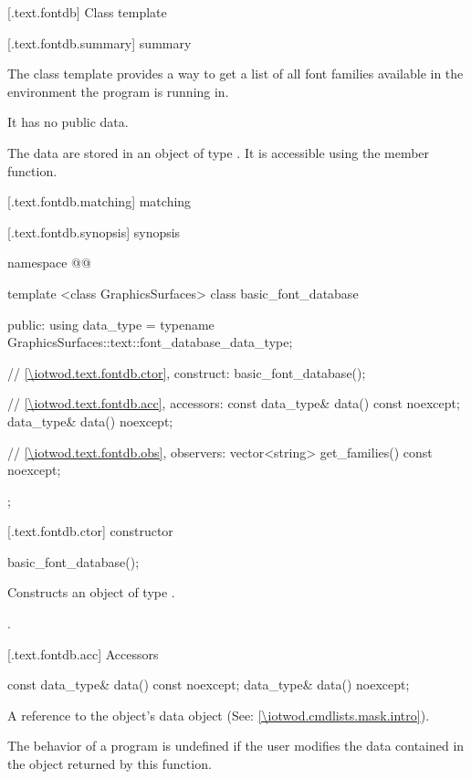 
 [\iotwod.text.fontdb] {Class template }

 [\iotwod.text.fontdb.summary] { summary}

\pnum
{}%
The  class template provides a way to get a list of all font families available in the environment the program is running in.

\pnum
It has no public data.

\pnum
The data are stored in an object of type . It is accessible using the  member function.

 [\iotwod.text.fontdb.matching]{ matching}

 [\iotwod.text.fontdb.synopsis] { synopsis}

\begin{codeblock}
namespace @\fullnamespace{}@ {
  template <class GraphicsSurfaces>
  class basic_font_database {
  public:
    using data_type = typename GraphicsSurfaces::text::font_database_data_type;

    // \ref{\iotwod.text.fontdb.ctor}, construct:
    basic_font_database();

    // \ref{\iotwod.text.fontdb.acc}, accessors:
    const data_type& data() const noexcept;
    data_type& data() noexcept;

    // \ref{\iotwod.text.fontdb.obs}, observers:
    vector<string> get_families() const noexcept;
  };
}
\end{codeblock}

 [\iotwod.text.fontdb.ctor] { constructor}

%
\begin{itemdecl}
basic_font_database();
\end{itemdecl}
\begin{itemdescr}
\pnum
\effects Constructs an object of type .

\pnum
\postconditions {}.
\end{itemdescr}

 [\iotwod.text.fontdb.acc] {Accessors}%

%
\begin{itemdecl}
const data_type& data() const noexcept;
data_type& data() noexcept;
\end{itemdecl}
\begin{itemdescr}
\pnum
\returns A reference to the  object's data object (See: \ref{\iotwod.cmdlists.mask.intro}).

\pnum
\remarks The behavior of a program is undefined if the user modifies the data contained in the  object returned by this function.
\end{itemdescr}

